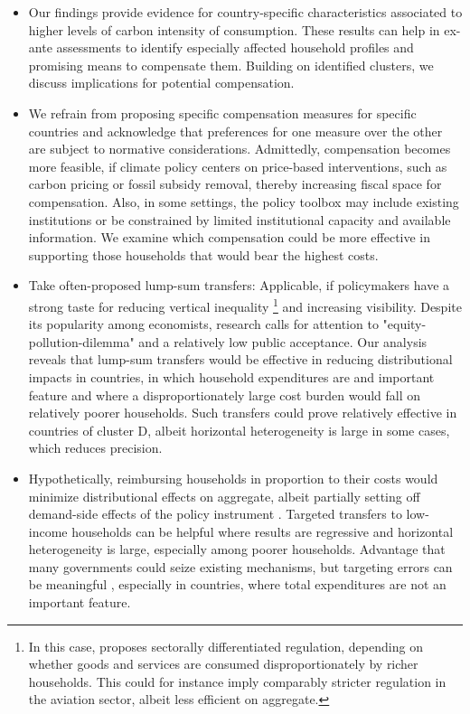 \documentclass[12pt, a4paper]{article}
\begin{document}
\begin{itemize}
\item Our findings provide evidence for country-specific characteristics associated to higher levels of carbon intensity of consumption. These results can help in ex-ante assessments to identify especially affected household profiles and promising means to compensate them. Building on identified clusters, we discuss implications for potential compensation.
\item We refrain from proposing specific compensation measures for specific countries and acknowledge that preferences for one measure over the other are subject to normative considerations. Admittedly, compensation becomes more feasible, if climate policy centers on price-based interventions, such as carbon pricing or fossil subsidy removal, thereby increasing fiscal space for compensation. Also, in some settings, the policy toolbox may include existing institutions or be constrained by limited institutional capacity and available information. We examine which compensation could be more effective in supporting those households that would bear the highest costs.  
\item Take often-proposed lump-sum transfers: Applicable, if policymakers have a strong taste for reducing vertical inequality \footnote{In this case, \textcite{Stiglitz.2019} proposes sectorally differentiated regulation, depending on whether goods and services are consumed disproportionately by richer households. This could for instance imply comparably stricter regulation in the aviation sector, albeit less efficient on aggregate.} and increasing visibility. Despite its popularity among economists, research calls for attention to "equity-pollution-dilemma" \autocite{Sager.2019} and a relatively low public acceptance. Our analysis reveals that lump-sum transfers would be effective in reducing distributional impacts in countries, in which household expenditures are and important feature and where a disproportionately large cost burden would fall on relatively poorer households. Such transfers could prove relatively effective in countries of cluster D, albeit horizontal heterogeneity is large in some cases, which reduces precision.
\item Hypothetically, reimbursing households in proportion to their costs would minimize distributional effects on aggregate, albeit partially setting off demand-side effects of the policy instrument \autocite{Stiglitz.2019}. Targeted transfers to low-income households can be helpful where results are regressive and horizontal heterogeneity is large, especially among poorer households. Advantage that many governments could seize existing mechanisms, but targeting errors can be meaningful \autocite{Banerjee.2022}, especially in countries, where total expenditures are not an important feature.

\end{itemize}
\end{document}
